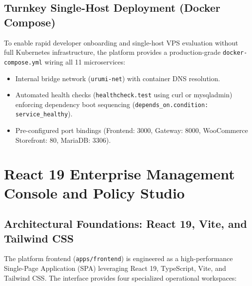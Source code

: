 \documentclass[11pt,a4paper]{article}
\begin{document}
\subsection{Turnkey Single-Host Deployment (Docker Compose)}
To enable rapid developer onboarding and single-host VPS evaluation without full Kubernetes infrastructure, the platform provides a production-grade \texttt{docker-compose.yml} wiring all 11 microservices:
\begin{itemize}[leftmargin=*]
    \item Internal bridge network (\texttt{urumi-net}) with container DNS resolution.
    \item Automated health checks (\texttt{healthcheck.test} using curl or mysqladmin) enforcing dependency boot sequencing (\texttt{depends\_on.condition: service\_healthy}).
    \item Pre-configured port bindings (Frontend: 3000, Gateway: 8000, WooCommerce Storefront: 80, MariaDB: 3306).
\end{itemize}

\section{React 19 Enterprise Management Console and Policy Studio}

\subsection{Architectural Foundations: React 19, Vite, and Tailwind CSS}
The platform frontend (\texttt{apps/frontend}) is engineered as a high-performance Single-Page Application (SPA) leveraging React 19, TypeScript, Vite, and Tailwind CSS. The interface provides four specialized operational workspaces:
\end{document}
